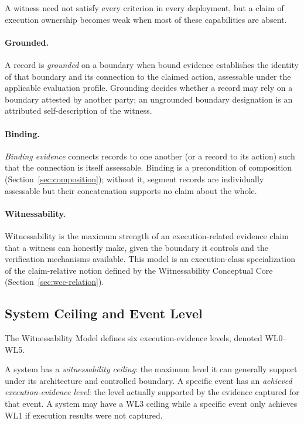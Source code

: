 \documentclass[11pt]{article}
\begin{document}
A witness need not satisfy every criterion in every deployment, but a claim of execution ownership becomes weak when most of these capabilities are absent.

\paragraph{Grounded.} A record is \emph{grounded} on a boundary when bound evidence establishes the identity of that boundary and its connection to the claimed action, assessable under the applicable evaluation profile. Grounding decides whether a record may rely on a boundary attested by another party; an ungrounded boundary designation is an attributed self-description of the witness.

\paragraph{Binding.} \emph{Binding evidence} connects records to one another (or a record to its action) such that the connection is itself assessable. Binding is a precondition of composition (Section~\ref{sec:composition}); without it, segment records are individually assessable but their concatenation supports no claim about the whole.

\paragraph{Witnessability.} Witnessability is the maximum strength of an execution-related evidence claim that a witness can honestly make, given the boundary it controls and the verification mechanisms available. This model is an execution-class specialization of the claim-relative notion defined by the Witnessability Conceptual Core~\cite{wcc_core_2026} (Section~\ref{sec:wcc-relation}).

\subsection{System Ceiling and Event Level}
The Witnessability Model defines six execution-evidence levels, denoted WL0--WL5.

A system has a \emph{witnessability ceiling}: the maximum level it can generally support under its architecture and controlled boundary. A specific event has an \emph{achieved execution-evidence level}: the level actually supported by the evidence captured for that event. A system may have a WL3 ceiling while a specific event only achieves WL1 if execution results were not captured.
\end{document}
